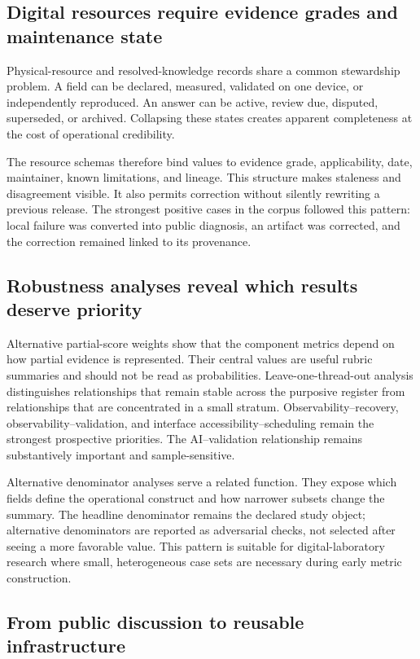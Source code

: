 \subsection{Digital resources require evidence grades and maintenance state}

Physical-resource and resolved-knowledge records share a common stewardship problem. A field can be declared, measured, validated on one device, or independently reproduced. An answer can be active, review due, disputed, superseded, or archived. Collapsing these states creates apparent completeness at the cost of operational credibility.

The resource schemas therefore bind values to evidence grade, applicability, date, maintainer, known limitations, and lineage. This structure makes staleness and disagreement visible. It also permits correction without silently rewriting a previous release. The strongest positive cases in the corpus followed this pattern: local failure was converted into public diagnosis, an artifact was corrected, and the correction remained linked to its provenance.

\subsection{Robustness analyses reveal which results deserve priority}

Alternative partial-score weights show that the component metrics depend on how partial evidence is represented. Their central values are useful rubric summaries and should not be read as probabilities. Leave-one-thread-out analysis distinguishes relationships that remain stable across the purposive register from relationships that are concentrated in a small stratum. Observability--recovery, observability--validation, and interface accessibility--scheduling remain the strongest prospective priorities. The AI--validation relationship remains substantively important and sample-sensitive.

Alternative denominator analyses serve a related function. They expose which fields define the operational construct and how narrower subsets change the summary. The headline denominator remains the declared study object; alternative denominators are reported as adversarial checks, not selected after seeing a more favorable value. This pattern is suitable for digital-laboratory research where small, heterogeneous case sets are necessary during early metric construction.

\subsection{From public discussion to reusable infrastructure}

